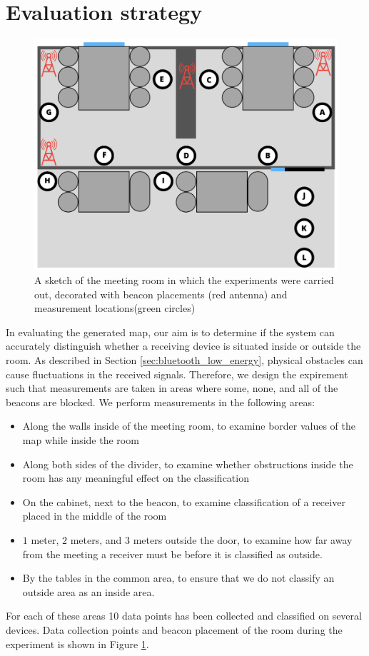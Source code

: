\section{Evaluation strategy} %
\begin{figure}[h]
    \centering
    \includegraphics[scale=0.5]{images/experiment_setup.png}
    \caption{A sketch of the meeting room in which the experiments were carried out, decorated with beacon placements (red antenna) and measurement locations(green circles)}
    \label{fig:experiment_setup}
\end{figure}
In evaluating the generated map, our aim is to determine if the system can accurately distinguish whether a receiving device is situated inside or outside the room.
As described in Section \ref{sec:bluetooth_low_energy}, physical obstacles can cause fluctuations in the received signals. 
Therefore, we design the expirement such that measurements are taken in areas where some, none, and all of the beacons are blocked. 
We perform measurements in the following areas:
\begin{itemize}
    \item Along the walls inside of the meeting room, to examine border values of the map while inside the room
    \item Along both sides of the divider, to examine whether obstructions inside the room has any meaningful effect on the classification
    \item On the cabinet, next to the beacon, to examine classification of a receiver placed in the middle of the room
    \item $1$ meter, $2$ meters, and $3$ meters outside the door, to examine how far away from the meeting a receiver must be before it is classified as outside.
    \item By the tables in the common area, to ensure that we do not classify an outside area as an inside area.
\end{itemize}
For each of these areas 10 data points has been collected and classified on several devices.
Data collection points and beacon placement of the room during the experiment is shown in Figure \ref{fig:experiment_setup}. 
